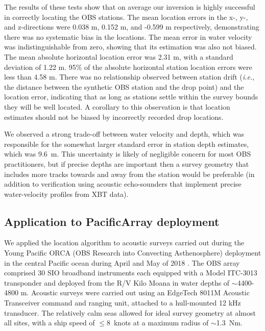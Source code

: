 The results of these tests show that on average our inversion is highly successful in correctly locating the OBS stations. The mean location errors in the x-, y-, and z-directions were 0.038 m, 0.152 m, and -0.599 m respectively, demonstrating there was no systematic bias in the locations. The mean error in water velocity was indistinguishable from zero, showing that its estimation was also not biased. The mean absolute horizontal location error was 2.31 m, with a standard deviation of 1.22 m. 95\% of the absolute horizontal station location errors were less than 4.58 m. There was no relationship observed between station drift (\textit{i.e.}, the distance between the synthetic OBS station and the drop point) and the location error, indicating that as long as stations settle within the survey bounds they will be well located. A corollary to this observation is that location estimates should not be biased by incorrectly recorded drop locations. 

We observed a strong trade-off between water velocity and depth, which was responsible for the somewhat larger standard error in station depth estimates, which was \mbox{9.6 m}. This uncertainty is likely of negligible concern for most OBS practitioners, but if precise depths are important then a survey geometry that includes more tracks towards and away from the station would be preferable (in addition to verification using acoustic echo-sounders that implement precise water-velocity profiles from XBT data).

\subsection{Application to PacificArray deployment}
We applied the location algorithm to acoustic surveys carried out during the Young Pacific ORCA (OBS Research into Convecting Asthenosphere) deployment in the central Pacific ocean during April and May of 2018 \citep{Gaherty2018}. The OBS array comprised 30 SIO broadband instruments each equipped with a Model ITC-3013 transponder and deployed from the R/V Kilo Moana in water depths of $\sim$4400-4800 m. Acoustic  surveys were carried out using an EdgeTech 8011M Acoustic Transceiver command and ranging unit, attached to a hull-mounted 12 kHz transducer. The relatively calm seas allowed for ideal survey geometry at almost all sites, with a ship speed of \mbox{$\le$8 knots} at a maximum radius of \mbox{$\sim$1.3 Nm}. 

